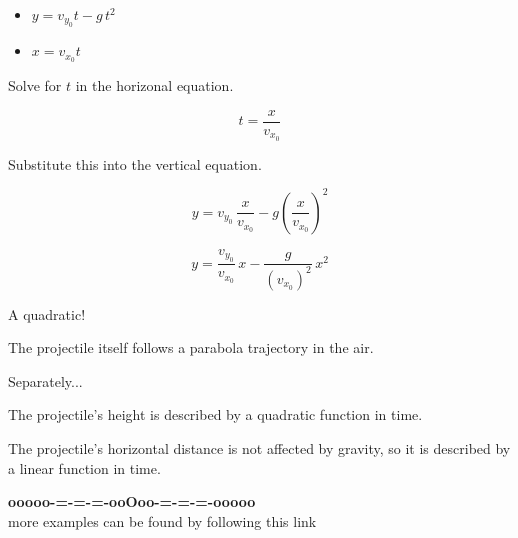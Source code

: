 \documentclass{ximera}
\begin{document}
\begin{itemize}
\item $y = v_{y_0} t - g \, t^2$


\item $x = v_{x_0} t$
\end{itemize}


Solve for $t$ in the horizonal equation.


\[ t = \frac{x}{v_{x_0}} \]

Substitute this into the vertical equation.


\[  y = v_{y_0} \, \frac{x}{v_{x_0}} - g \left(\frac{x}{v_{x_0}}\right)^2  \]



\[  y = \frac{v_{y_0}}{v_{x_0}} \, x  - \frac{g}{(v_{x_0})^2} \, x^2 \]



A quadratic! 

The projectile itself follows a parabola trajectory in the air. 


Separately...


The projectile's height is described by a quadratic function in time. 


The projectile's horizontal distance is not affected by gravity, so it is described by a linear function in time. 












\begin{center}
\textbf{\textcolor{green!50!black}{ooooo-=-=-=-ooOoo-=-=-=-ooooo}} \\

more examples can be found by following this link\\ 

\end{center}
\end{document}
